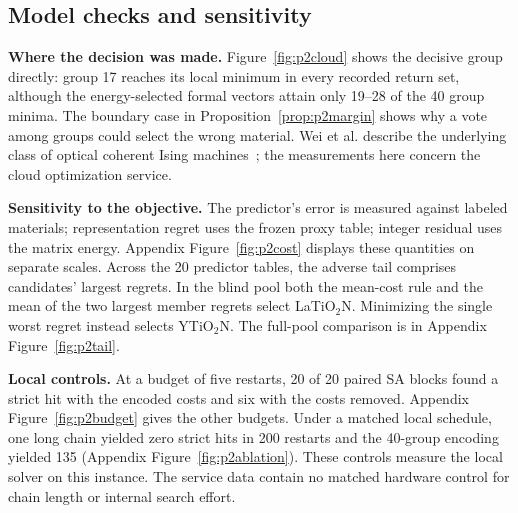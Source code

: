 \subsection{Model checks and sensitivity}\label{sec:p2checks}
\textbf{Where the decision was made.} Figure~\ref{fig:p2cloud} shows the decisive group directly: group 17 reaches its local minimum in every recorded return set, although the energy-selected formal vectors attain only 19--28 of the 40 group minima. The boundary case in Proposition~\ref{prop:p2margin} shows why a vote among groups could select the wrong material. Wei et al. describe the underlying class of optical coherent Ising machines~\cite{wei2026}; the measurements here concern the cloud optimization service.

\textbf{Sensitivity to the objective.} The predictor's error is measured against labeled materials; representation regret uses the frozen proxy table; integer residual uses the matrix energy. Appendix Figure~\ref{fig:p2cost} displays these quantities on separate scales. Across the 20 predictor tables, the adverse tail comprises candidates' largest regrets. In the blind pool both the mean-cost rule and the mean of the two largest member regrets select LaTiO$_2$N. Minimizing the single worst regret instead selects YTiO$_2$N. The full-pool comparison is in Appendix Figure~\ref{fig:p2tail}.

\textbf{Local controls.} At a budget of five restarts, 20 of 20 paired SA blocks found a strict hit with the encoded costs and six with the costs removed. Appendix Figure~\ref{fig:p2budget} gives the other budgets. Under a matched local schedule, one long chain yielded zero strict hits in 200 restarts and the 40-group encoding yielded 135 (Appendix Figure~\ref{fig:p2ablation}). These controls measure the local solver on this instance. The service data contain no matched hardware control for chain length or internal search effort.

